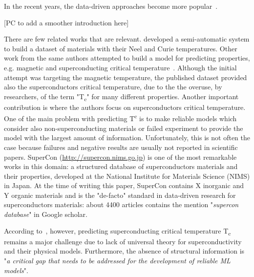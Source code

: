 \documentclass{article}
\begin{document}
In the recent years, the data-driven approaches become more popular~\cite{stanev_machine_2017, le2020critical,Hamlin2019SuperconductivityNR}.

[PC to add a smoother introduction here]

There are few related works that are relevant. \cite{court2018auto} developed a semi-automatic system to build a dataset of materials with their Neel and Curie temperatures. Other work from the same authors attempted to build a model for predicting properties, e.g. magnetic and superconducting critical temperature~\cite{court_magnetic_2020}. Although the initial attempt was targeting the magnetic temperature, the published dataset provided also the superconductors critical temperature, due to the the overuse, by researchers, of the term "T\textsubscript{c}" for many different properties. 
Another important contribution is \cite{yamaguchi-etal-2020-sc} where the authors focus on superconductors critical temperature. 
One of the main problem with predicting T\textsuperscript{c} is to make reliable models which consider also non-superconducting materials or failed experiment to provide the model with the largest amount of information. Unfortunately, this is not often the case because failures and negative results are usually not reported in scientific papers.
SuperCon (\url{http://supercon.nims.go.jp}) is one of the most remarkable works in this domain: a structured database of superconductors materials and their properties, developed at the National Institute for Materials Science (NIMS) in Japan. 
At the time of writing this paper, SuperCon contains  X inorganic and Y organic materials and is the "de-facto" standard in data-driven research for superconductors materials: about 4400 articles contains the mention "\textit{supercon database}" in Google scholar. 

According to~\cite{chen2020acritical}, however, predicting superconducting critical temperature T\textsubscript{c} remains a major challenge due to lack of universal theory for superconductivity and their physical models. 
Furthermore, the absence of  structural information is "\textit{a critical gap that needs to be addressed for the development of reliable ML models}".
\end{document}
